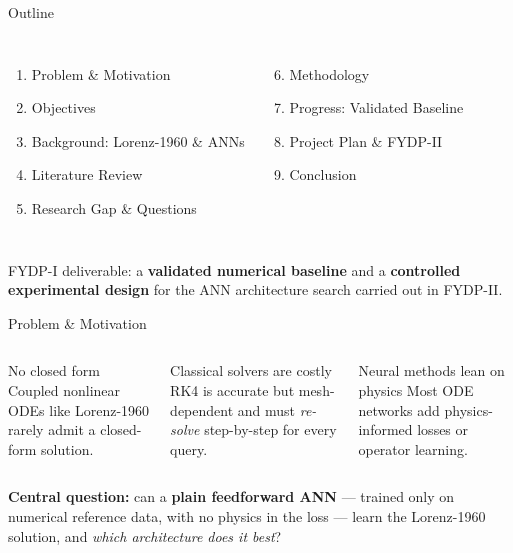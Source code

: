 \documentclass[aspectratio=169,11pt]{beamer}
\begin{document}
\begin{frame}{Outline}
  \begin{columns}[T]
      \begin{enumerate}
        \item Problem \& Motivation
        \item Objectives
        \item Background: Lorenz-1960 \& ANNs
        \item Literature Review
        \item Research Gap \& Questions
      \end{enumerate}
      \begin{enumerate}
        \setcounter{enumi}{5}
        \item Methodology
        \item Progress: Validated Baseline
        \item Project Plan \& FYDP-II
        \item Conclusion
      \end{enumerate}
  \end{columns}
  \vspace{0.4cm}
  \begin{plaincard}
    \centering FYDP-I deliverable: a \textbf{validated numerical baseline} and a \textbf{controlled experimental design}
    for the ANN architecture search carried out in FYDP-II.
  \end{plaincard}
\end{frame}

\begin{frame}{Problem \& Motivation}
  \begin{columns}[t]
      \begin{card}{No closed form}
        \footnotesize Coupled nonlinear ODEs like Lorenz-1960 rarely admit a closed-form solution.
      \end{card}
      \begin{card}{Classical solvers are costly}
        \footnotesize RK4 is accurate but mesh-dependent and must \emph{re-solve} step-by-step for every query.
      \end{card}
      \begin{card}{Neural methods lean on physics}
        \footnotesize Most ODE networks add physics-informed losses or operator learning.
      \end{card}
  \end{columns}
  \vspace{0.35cm}
  \begin{plaincard}
    \centering\textbf{Central question:} can a \textcolor{tealDark}{\bfseries plain feedforward ANN} ---
    trained only on numerical reference data, with no physics in the loss --- learn the Lorenz-1960 solution,
    and \emph{which architecture does it best}?
  \end{plaincard}
\end{frame}
\end{document}
